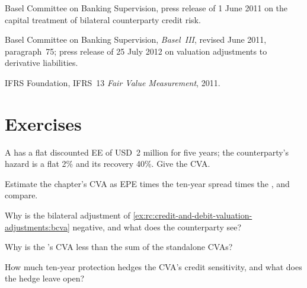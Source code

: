 \begin{omsources}
\item Basel Committee on Banking Supervision, press release of 1 June 2011 on the capital
treatment of bilateral counterparty credit risk.
\item Basel Committee on Banking Supervision, \emph{Basel~III}, revised June 2011,
paragraph~75; press release of 25 July 2012 on valuation adjustments to derivative
liabilities.
\item IFRS Foundation, IFRS~13 \emph{Fair Value Measurement}, 2011.
\end{omsources}

\section{Exercises}

\begin{exercise}[$\star$]\label{exo:rc:credit-and-debit-valuation-adjustments:1}
A  has a flat discounted EE of USD~2 million for five years; the counterparty's
hazard is a flat 2\% and its recovery 40\%. Give the CVA.
\end{exercise}

\begin{exercise}[$\star$]\label{exo:rc:credit-and-debit-valuation-adjustments:2}
Estimate the chapter's CVA as EPE times the ten-year spread times the , and
compare.
\end{exercise}

\begin{exercise}[$\star$]\label{exo:rc:credit-and-debit-valuation-adjustments:3}
Why is the bilateral adjustment of \cref{ex:rc:credit-and-debit-valuation-adjustments:bcva}
negative, and what does the counterparty see?
\end{exercise}

\begin{exercise}[$\star\star$]\label{exo:rc:credit-and-debit-valuation-adjustments:4}
Why is the 's CVA less than the sum of the standalone CVAs?
\end{exercise}

\begin{exercise}[$\star\star$]\label{exo:rc:credit-and-debit-valuation-adjustments:5}
How much ten-year protection hedges the CVA's credit sensitivity, and what does the hedge
leave open?
\end{exercise}

